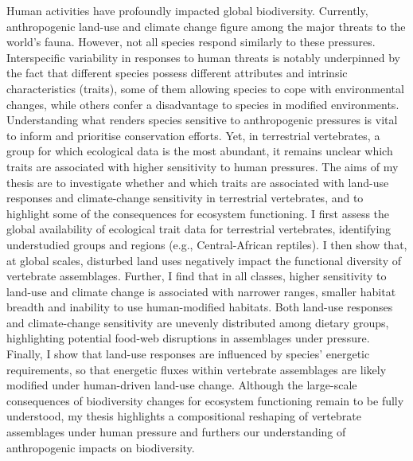 
Human activities have profoundly impacted global biodiversity. Currently, anthropogenic land-use and climate change figure among the major threats to the world’s fauna. However, not all species respond similarly to these pressures. Interspecific variability in responses to human threats is notably underpinned by the fact that different species possess different attributes and intrinsic characteristics (traits), some of them allowing species to cope with environmental changes, while others confer a disadvantage to species in modified environments. Understanding what renders species sensitive to anthropogenic pressures is vital to inform and prioritise conservation efforts. Yet, in terrestrial vertebrates, a group for which ecological data is the most abundant, it remains unclear which traits are associated with higher sensitivity to human pressures.   The aims of my thesis are to investigate whether and which traits are associated with  land-use responses and climate-change sensitivity in terrestrial vertebrates, and to highlight some of the consequences for ecosystem functioning. I first assess the global availability of ecological trait data for terrestrial vertebrates, identifying understudied groups and regions (e.g., Central-African reptiles). I then show that, at global scales, disturbed land uses negatively impact the functional diversity of vertebrate assemblages.  Further, I find that in all classes, higher sensitivity to land-use and climate change is associated with  narrower ranges, smaller habitat breadth and inability to use human-modified habitats. Both land-use responses and climate-change sensitivity are unevenly distributed among dietary groups, highlighting potential food-web disruptions in assemblages under pressure.  Finally, I show that land-use responses are influenced by species' energetic requirements, so that energetic fluxes within vertebrate assemblages are likely modified under human-driven land-use change. Although the large-scale consequences of biodiversity changes for ecosystem functioning remain to be fully understood, my thesis highlights a compositional reshaping of vertebrate assemblages under human pressure and furthers our understanding of anthropogenic impacts on biodiversity.  